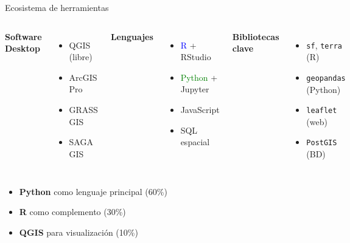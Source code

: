 \documentclass[10pt]{beamer}
\newcommand{\examplebox}[2]{
\begin{tcolorbox}[colframe=usachblue,colback=white,title=#1]
#2
\end{tcolorbox}
}
\begin{document}
\begin{frame}{Ecosistema de herramientas}
    \begin{columns}
        \textbf{Software Desktop}
        \begin{itemize}
            \item QGIS (libre)
            \item ArcGIS Pro
            \item GRASS GIS
            \item SAGA GIS
        \end{itemize}
        
        \textbf{Lenguajes}
        \begin{itemize}
            \item \textcolor{blue}{R} + RStudio
            \item \textcolor{green}{Python} + Jupyter
            \item JavaScript
            \item SQL espacial
        \end{itemize}
        
        \textbf{Bibliotecas clave}
        \begin{itemize}
            \item \texttt{sf}, \texttt{terra} (R)
            \item \texttt{geopandas} (Python)
            \item \texttt{leaflet} (web)
            \item \texttt{PostGIS} (BD)
        \end{itemize}
    \end{columns}
    
    \vspace{0.5cm}
    \examplebox{En este curso usaremos:}{
        \begin{itemize}
            \item \textbf{Python} como lenguaje principal (60\%)
            \item \textbf{R} como complemento (30\%)
            \item \textbf{QGIS} para visualización (10\%)
        \end{itemize}
    }
\end{frame}
\end{document}
